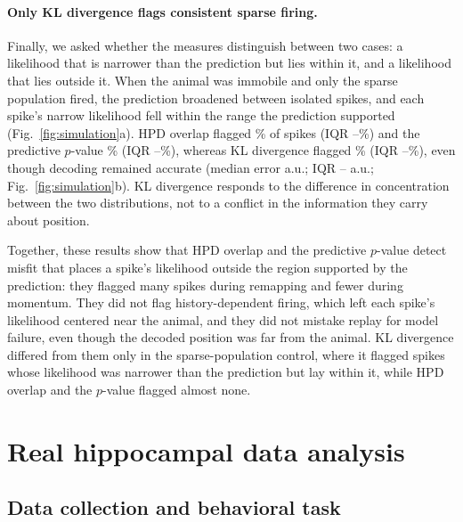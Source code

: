 \documentclass[12pt]{article}
\begin{document}
\paragraph{Only KL divergence flags consistent sparse firing.} Finally, we asked whether the measures distinguish between two cases: a likelihood that is narrower than the prediction but lies within it, and a likelihood that lies outside it. When the animal was immobile and only the sparse population fired, the prediction broadened between isolated spikes, and each spike's narrow likelihood fell within the range the prediction supported (Fig.~\ref{fig:simulation}a). HPD overlap flagged \SimFlagSparseHpd\% of spikes (IQR \SimFlagSparseHpdQuartileLow--\SimFlagSparseHpdQuartileHigh\%) and the predictive $p$-value \SimFlagSparsePvalue\% (IQR \SimFlagSparsePvalueQuartileLow--\SimFlagSparsePvalueQuartileHigh\%), whereas KL divergence flagged \SimFlagSparseKl\% (IQR \SimFlagSparseKlQuartileLow--\SimFlagSparseKlQuartileHigh\%), even though decoding remained accurate (median error \SimSparseError{} a.u.; IQR \SimSparseErrorQuartileLow--\SimSparseErrorQuartileHigh{} a.u.; Fig.~\ref{fig:simulation}b). KL divergence responds to the difference in concentration between the two distributions, not to a conflict in the information they carry about position.

Together, these results show that HPD overlap and the predictive $p$-value detect misfit that places a spike's likelihood outside the region supported by the prediction: they flagged many spikes during remapping and fewer during momentum. They did not flag history-dependent firing, which left each spike's likelihood centered near the animal, and they did not mistake replay for model failure, even though the decoded position was far from the animal. KL divergence differed from them only in the sparse-population control, where it flagged spikes whose likelihood was narrower than the prediction but lay within it, while HPD overlap and the $p$-value flagged almost none.

\section*{Real hippocampal data analysis}\label{sec:realdata}

\subsection*{Data collection and behavioral task}\label{sec:realdatamethods}
\end{document}
